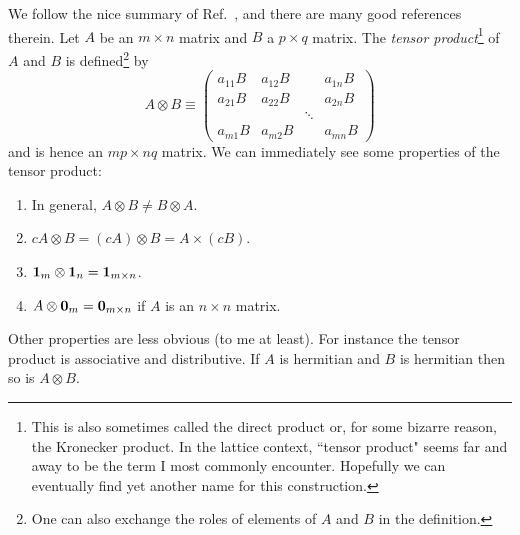 We follow the nice summary of Ref.~\cite{matrixCalc}, and there
are many good references therein.
Let $A$ be an $m\times n$ matrix and $B$ a $p\times q$ matrix. 
The {\it tensor product}\footnote{This is also sometimes called
the direct product 
or, for some bizarre reason,
the Kronecker product. 
In the lattice context, ``tensor product" seems far and away to be
the term I most commonly encounter.
Hopefully we can eventually
find yet another name for this construction.} 
of $A$ and $B$ is defined\footnote{One can also exchange the roles
of elements of $A$ and $B$ in the definition.} by
\begin{equation}
A \otimes B\equiv\left(\begin{array}{cccc}
a_{11} B & a_{12} B &  & a_{1 n} B \\
a_{21} B & a_{22} B &  & a_{2 n} B \\
 &  & \ddots &  \\
a_{m 1} B & a_{m 2} B &  & a_{m n} B
\end{array}\right)
\end{equation}
and is hence an $mp\times nq$ matrix.
We can immediately see some properties of the tensor product:
\begin{enumerate}
\item In general, $A\otimes B\neq B\otimes A$. 
\item $cA\otimes B=(cA)\otimes B=A\times(cB)$.
\item ${\mathbf 1}_m\otimes{\mathbf 1}_n={\mathbf 1}_{m\times n}$.
\item $A\otimes {\mathbf 0}_m={\mathbf 0}_{m\times n}$ if $A$ is an $n\times n$ matrix.
\end{enumerate}
Other properties are less obvious (to me at least). For instance
the tensor product is associative and distributive.
If $A$ is hermitian and $B$ is hermitian then so is $A\otimes B$.

